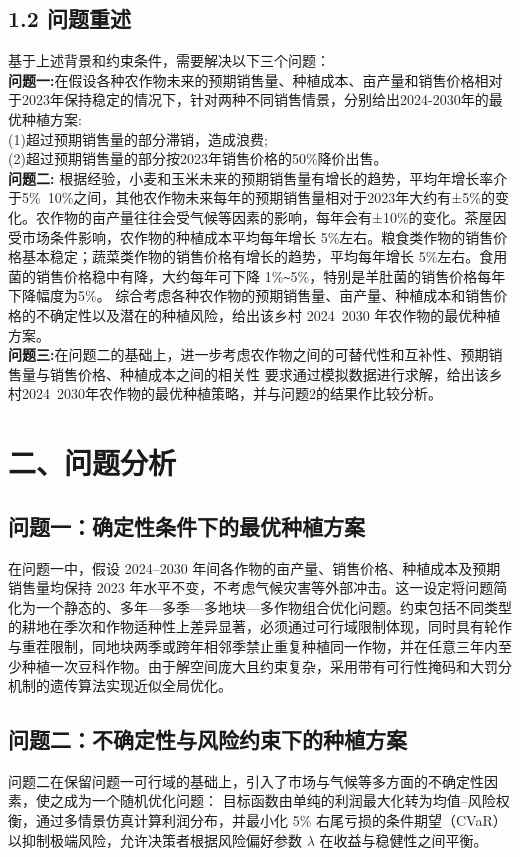 \documentclass[12pt]{article}
\begin{document}
\subsection{1.2 问题重述}
\noindent 基于上述背景和约束条件，需要解决以下三个问题：\\
\textbf{问题一:}在假设各种农作物未来的预期销售量、种植成本、亩产量和销售价格相对于2023年保持稳定的情况下，针对两种不同销售情景，分别给出2024-2030年的最优种植方案:\\
(1)超过预期销售量的部分滞销，造成浪费;\\
(2)超过预期销售量的部分按2023年销售价格的50\%降价出售。\\
\textbf{问题二:} 根据经验，小麦和玉米未来的预期销售量有增长的趋势，平均年增长率介于5\%~10\%之间，其他农作物未来每年的预期销售量相对于2023年大约有±5\%的变化。农作物的亩产量往往会受气候等因素的影响，每年会有±10\%的变化。茶屋因受市场条件影响，农作物的种植成本平均每年增长 5\%左右。粮食类作物的销售价格基本稳定；蔬菜类作物的销售价格有增长的趋势，平均每年增长 5\%左右。食用菌的销售价格稳中有降，大约每年可下降 1\%\verb|~|5\%，特别是羊肚菌的销售价格每年下降幅度为5\%。 
综合考虑各种农作物的预期销售量、亩产量、种植成本和销售价格的不确定性以及潜在的种植风险，给出该乡村 2024~2030 年农作物的最优种植方案。 \\
\textbf{问题三:}在问题二的基础上，进一步考虑农作物之间的可替代性和互补性、预期销售量与销售价格、种植成本之间的相关性
要求通过模拟数据进行求解，给出该乡村2024~2030年农作物的最优种植策略，并与问题2的结果作比较分析。 

\section{二、问题分析}

\subsection{问题一：确定性条件下的最优种植方案}
在问题一中，假设 2024–2030 年间各作物的亩产量、销售价格、种植成本及预期销售量均保持 2023 年水平不变，不考虑气候灾害等外部冲击。这一设定将问题简化为一个静态的、多年—多季—多地块—多作物组合优化问题。约束包括不同类型的耕地在季次和作物适种性上差异显著，必须通过可行域限制体现，同时具有轮作与重茬限制，同地块两季或跨年相邻季禁止重复种植同一作物，并在任意三年内至少种植一次豆科作物。由于解空间庞大且约束复杂，采用带有可行性掩码和大罚分机制的遗传算法实现近似全局优化。

\subsection{问题二：不确定性与风险约束下的种植方案}
问题二在保留问题一可行域的基础上，引入了市场与气候等多方面的不确定性因素，使之成为一个随机优化问题：
目标函数由单纯的利润最大化转为均值–风险权衡，通过多情景仿真计算利润分布，并最小化 5\% 右尾亏损的条件期望（CVaR）以抑制极端风险\cite{xu2025}，允许决策者根据风险偏好参数 $\lambda$ 在收益与稳健性之间平衡。
\end{document}
